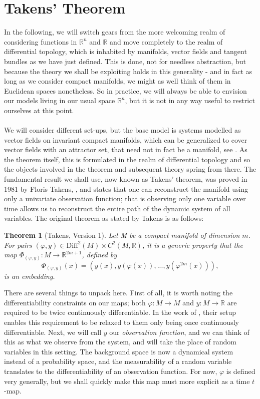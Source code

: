 \documentclass[11pt, a4paper]{memoir}
\theoremstyle{break}
\newtheorem{thm}{Theorem}
\theoremstyle{break}
\theoremstyle{nonumberplain}
\newcommand{\mR}{\mathbb{R}}
\begin{document}
\section{Takens' Theorem}
In the following, we will switch gears from the more welcoming realm of considering functions in $\mR^n$ and $\mR$ and move completely to the realm of differential topology, which is inhabited by manifolds, vector fields and tangent bundles as we have just defined. This is done, not for needless abstraction, but because the theory we shall be exploiting holds in this generality - and in fact as long as we consider compact manifolds, we might as well think of them in Euclidean spaces nonetheless. So in practice, we will always be able to envision our models living in our usual space $\mR^n$, but it is not in any way useful to restrict ourselves at this point.\\\\
We will consider different set-ups, but the base model is systems modelled as vector fields on invariant compact manifolds, which can be generalized to cover vector fields with an attractor set, that need not in fact be a manifold, see \cite{Sauer1991}. As the theorem itself, this is formulated in the realm of differential topology and so the objects involved in the theorem and subsequent theory spring from there. The fundamental result we shall use, now known as Takens' theorem, was proved in 1981 by Floris Takens, \cite{Takens}, and states that one can reconstruct the manifold using only a univariate observation function; that is observing only one variable over time allows us to reconstruct the entire path of the dynamic system of all variables. The original theorem as stated by Takens is as follows:
\begin{thm}[Takens, Version 1]
Let M be a compact manifold of dimension $m$. For pairs $(\varphi,y)\in \text{Diff}^2(M)\times C^2(M,\mathbb{R})$, it is a generic property that the map $\Phi_{(\varphi,y)}:M\to \mathbb{R}^{2m+1}$, defined by
$$\Phi_{(\varphi,y)}(x)=(y(x),y(\varphi(x)),...,y(\varphi^{2m}(x))),$$
is an embedding. \cite{Takens}
\end{thm}
There are several things to unpack here. First of all, it is worth noting the differentiability constraints on our maps; both $\varphi: M\to M$ and $y:M\to\mR$ are required to be twice continuously differentiable. In the work of \cite{Sauer1991}, their setup enables this requirement to be relaxed to them only being once continuously differentiable. Next, we will call $y$ our \textit{observation function}, and we can think of this as what we observe from the system, and will take the place of random variables in this setting. The background space is now a dynamical system instead of a probability space, and the measurability   of a random variable translates to the differentiability of an observation function. For now, $\varphi$ is defined very generally, but we shall quickly make this map must more explicit as a time $t$-map.\\\\
\end{document}
